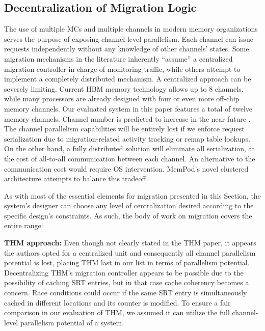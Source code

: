 
\subsection{Decentralization of Migration Logic}

The use of multiple MCs and multiple channels in modern memory organizations serves the purpose of exposing channel-level parallelism. Each channel can issue requests independently without any knowledge of other channels' states. Some migration mechanisms in the literature inherently ``assume'' a centralized migration controller in charge of monitoring traffic, while others attempt to implement a completely distributed mechanism. A centralized approach can be severely limiting. Current HBM memory technology allows up to 8 channels, while many processors are already designed with four or even more off-chip memory channels. Our evaluated system in this paper features a total of twelve memory channels. Channel number is predicted to increase in the near future \TODO{[cite]}. The channel parallelism capabilities will be entirely lost if we enforce request serialization due to migration-related activity tracking or remap table lookups. On the other hand, a fully distributed solution will eliminate all serialization, at the cost of all-to-all communication between each channel. An alternative to the communication cost would require OS intervention. MemPod's novel clustered architecture attempts to balance this tradeoff. 

As with most of the essential elements for migration presented in this Section, the system's designer can choose any level of centralization desired according to the specific design's constraints. As such, the body of work on migration covers the entire range:

	\textbf{THM approach:} Even though not clearly stated in the THM paper, it appears the authors opted for a centralized unit and consequently all channel parallelism potential is lost, placing THM last in our list in terms of parallelism potential. Decentralizing THM's migration controller appears to be possible due to the possibility of caching SRT entries, but in that case cache coherency becomes a concern. Race conditions could occur if the same SRT entry is simultaneously cached in different locations and its counter is modified. To ensure a fair comparison in our evaluation of THM, we assumed it can utilize the full channel-level parallelism potential of a system. 

